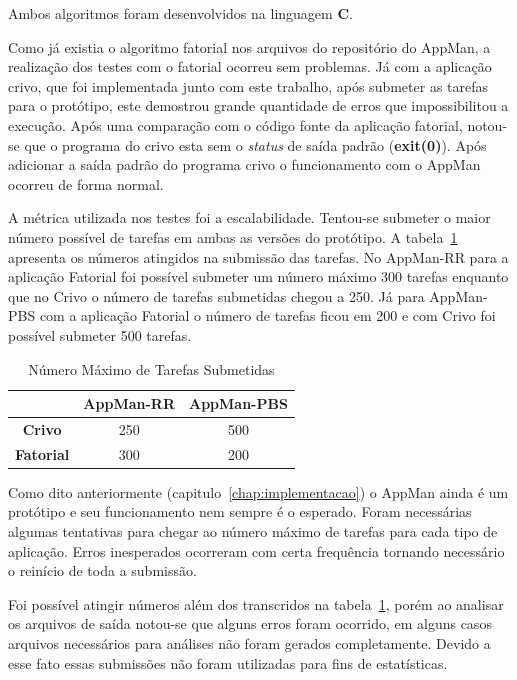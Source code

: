 Ambos algoritmos foram desenvolvidos na linguagem \textbf{C}.

Como já existia o algoritmo fatorial nos arquivos do repositório do AppMan, a realização dos testes com o fatorial ocorreu sem problemas. Já com a aplicação crivo, que foi implementada junto com este trabalho, após submeter as tarefas para o protótipo, este demostrou grande quantidade de erros que impossibilitou a execução. Após uma comparação com o código fonte da aplicação fatorial, notou-se que o programa do crivo esta sem o \emph{status} de saída padrão (\textbf{exit(0)}). Após adicionar a saída padrão do programa crivo o funcionamento com o AppMan ocorreu de forma normal.

A métrica utilizada nos testes foi a escalabilidade. Tentou-se submeter o maior número possível de tarefas em ambas as versões do protótipo. A tabela~\ref{tab:num_max_tarefas} apresenta os números atingidos na submissão das tarefas. No AppMan-RR para a aplicação Fatorial foi possível submeter um número máximo 300 tarefas enquanto que no Crivo o número de tarefas submetidas chegou a 250. Já para AppMan-PBS com a aplicação Fatorial o número de tarefas ficou em 200 e com Crivo foi possível submeter 500 tarefas.

\begin{table}[hbtp]
\begin{center}
\caption{Número Máximo de Tarefas Submetidas}
\label{tab:num_max_tarefas}
\begin{tabular}{c|c|c}
	\hline
		& {\bf AppMan-RR} & {\bf AppMan-PBS}\\
	\hline
	{\bf Crivo} & 250 & 500\\ \hline
	\textbf{Fatorial} & 300 & 200\\ \hline
\end{tabular}
\end{center}
\end{table}

Como dito anteriormente (capitulo~\ref{chap:implementacao}) o AppMan ainda é um protótipo e seu funcionamento nem sempre é o esperado. Foram necessárias algumas tentativas para chegar ao número máximo de tarefas para cada tipo de aplicação. Erros inesperados ocorreram com certa frequência tornando necessário o reinício de toda a submissão. 

Foi possível atingir números além dos transcridos na tabela~\ref{tab:num_max_tarefas}, porém ao analisar os arquivos de saída notou-se que alguns erros foram ocorrido, em alguns casos arquivos necessários para análises não foram gerados completamente. Devido a esse fato essas submissões não foram utilizadas para fins de estatísticas.

